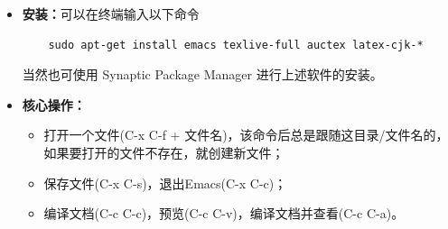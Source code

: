 \begin{itemize}	
	\item \textbf{安装：}可以在终端输入以下命令
	\begin{verbatim}
	sudo apt-get install emacs texlive-full auctex latex-cjk-*
	\end{verbatim}
    当然也可使用 Synaptic Package Manager 进行上述软件的安装。

	\item \textbf{核心操作：}
	\begin{itemize}
  		\item 打开一个文件(C-x C-f + 文件名)，该命令后总是跟随这目录/文件名的，
  			如果要打开的文件不存在，就创建新文件；
  		\item 保存文件(C-x C-s)，退出Emacs(C-x C-c)；
  		\item 编译文档(C-c C-c)，预览(C-c C-v)，编译文档并查看(C-c C-a)。 
	\end{itemize}


\end{itemize}
